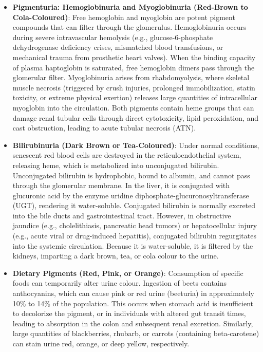 \begin{itemize}
  \item \textbf{Pigmenturia: Hemoglobinuria and Myoglobinuria (Red-Brown to Cola-Coloured)}: Free hemoglobin and myoglobin are potent pigment compounds that can filter through the glomerulus. Hemoglobinuria occurs during severe intravascular hemolysis (e.g., glucose-6-phosphate dehydrogenase deficiency crises, mismatched blood transfusions, or mechanical trauma from prosthetic heart valves). When the binding capacity of plasma haptoglobin is saturated, free hemoglobin dimers pass through the glomerular filter. Myoglobinuria arises from rhabdomyolysis, where skeletal muscle necrosis (triggered by crush injuries, prolonged immobilization, statin toxicity, or extreme physical exertion) releases large quantities of intracellular myoglobin into the circulation. Both pigments contain heme groups that can damage renal tubular cells through direct cytotoxicity, lipid peroxidation, and cast obstruction, leading to acute tubular necrosis (ATN).

  \item \textbf{Bilirubinuria (Dark Brown or Tea-Coloured)}: Under normal conditions, senescent red blood cells are destroyed in the reticuloendothelial system, releasing heme, which is metabolized into unconjugated bilirubin. Unconjugated bilirubin is hydrophobic, bound to albumin, and cannot pass through the glomerular membrane. In the liver, it is conjugated with glucuronic acid by the enzyme uridine diphosphate-glucuronosyltransferase (UGT), rendering it water-soluble. Conjugated bilirubin is normally excreted into the bile ducts and gastrointestinal tract. However, in obstructive jaundice (e.g., cholelithiasis, pancreatic head tumors) or hepatocellular injury (e.g., acute viral or drug-induced hepatitis), conjugated bilirubin regurgitates into the systemic circulation. Because it is water-soluble, it is filtered by the kidneys, imparting a dark brown, tea, or cola colour to the urine.

  \item \textbf{Dietary Pigments (Red, Pink, or Orange)}: Consumption of specific foods can temporarily alter urine colour. Ingestion of beets contains anthocyanins, which can cause pink or red urine (beeturia) in approximately 10\% to 14\% of the population. This occurs when stomach acid is insufficient to decolorize the pigment, or in individuals with altered gut transit times, leading to absorption in the colon and subsequent renal excretion. Similarly, large quantities of blackberries, rhubarb, or carrots (containing beta-carotene) can stain urine red, orange, or deep yellow, respectively.


\end{itemize}
